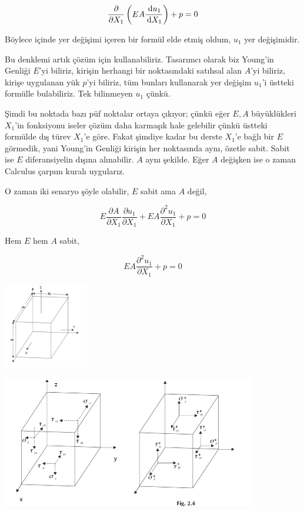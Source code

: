 \documentclass[12pt,fleqn]{article}\usepackage{../../common}
\begin{document}
$$
\frac{\partial }{\partial X_1} \left( E A \frac{\,\mathrm{d} u_1}{\,\mathrm{d} X_1} \right) + p = 0
$$

Böylece içinde yer değişimi içeren bir formül elde etmiş oldum, $u_1$ yer
değişimidir.

Bu denklemi artık çözüm için kullanabiliriz. Tasarımcı olarak biz Young'in
Genliği $E$'yi biliriz, kirişin herhangi bir noktasındaki satıhsal alan $A$'yi
biliriz, kirişe uygulanan yük $p$'yi biliriz, tüm bunları kullanarak yer değişim
$u_1$'i üstteki formülle bulabiliriz. Tek bilinmeyen $u_1$ çünkü.

Şimdi bu noktada bazı püf noktalar ortaya çıkıyor; çünkü eğer $E,A$ büyüklükleri
$X_1$'in fonksiyonu iseler çözüm daha karmaşık hale gelebilir çünkü üstteki
formülde dış türev $X_1$'e göre. Fakat şimdiye kadar bu derste $X_1$'e bağlı bir
$E$ görmedik, yani Young'in Genliği kirişin her noktasında aynı, özetle sabit.
Sabit ise $E$ diferansiyelin dışına alınabilir. $A$ aynı şekilde. Eğer $A$
değişken ise o zaman Calculus çarpım kuralı uygularız.

O zaman iki senaryo şöyle olabilir, $E$ sabit ama $A$ değil,

$$
E \frac{\partial A}{\partial X_1} \frac{\partial u_1}{\partial X_1} +
EA \frac{\partial^2 u_1}{\partial X_1} + p = 0
$$

Hem $E$ hem $A$ sabit,

$$
E A \frac{\partial^2 u_1}{\partial X_1} + p = 0
$$

\includegraphics[width=10em]{equilibrium_stress2.jpg}

\includegraphics[width=30em]{equilibrium_stress1.jpg}
\end{document}
